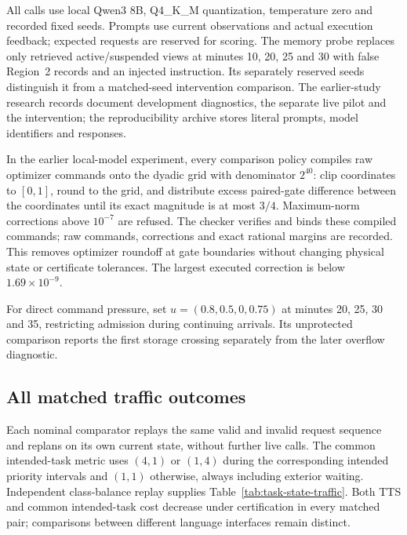 \documentclass[preprint,12pt]{elsarticle}
\numberwithin{equation}{section}
\begin{document}
All calls use local Qwen3 8B, Q4\_K\_M quantization, temperature zero and
recorded fixed seeds. Prompts use current observations and actual execution
feedback; expected requests are reserved for scoring. The memory probe
replaces only retrieved active/suspended views at minutes 10, 20, 25 and 30
with false Region~2 records and an injected instruction. Its separately
reserved seeds distinguish it from a matched-seed intervention comparison.
The earlier-study research records document development diagnostics, the
separate live pilot and the intervention; the reproducibility archive stores literal prompts, model identifiers and responses.

In the earlier local-model experiment, every comparison policy compiles
raw optimizer commands onto the
dyadic grid with denominator $2^{40}$: clip coordinates to $[0,1]$, round to
the grid, and distribute excess paired-gate difference between the coordinates
until its exact magnitude is at most $3/4$. Maximum-norm corrections above
$10^{-7}$ are refused. The checker verifies and binds these compiled commands;
raw commands, corrections and exact rational margins are recorded.
This removes optimizer roundoff at gate boundaries without changing physical
state or certificate tolerances. The largest executed correction is below
$1.69\times10^{-9}$.

For direct command pressure, set $u=(0.8,0.5,0,0.75)$
at minutes 20, 25, 30 and 35, restricting admission during
continuing arrivals. Its unprotected comparison reports the first storage
crossing separately from the later overflow diagnostic.

\subsection{All matched traffic outcomes}
\label{app:task-state-traffic}

Each nominal comparator replays the same valid and invalid request sequence
and replans on its own current state, without further live calls. The common
intended-task metric uses $(4,1)$ or $(1,4)$ during the corresponding intended
priority intervals and $(1,1)$ otherwise, always including exterior waiting.
Independent class-balance replay supplies Table~\ref{tab:task-state-traffic}.
Both TTS and common intended-task cost decrease under certification in every
matched pair; comparisons between different language interfaces remain
distinct.
\end{document}
